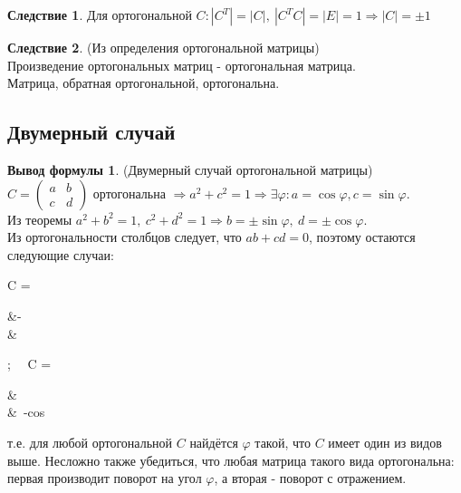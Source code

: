 \documentclass[a4paper, 12pt]{article}
\renewcommand{\phi}{\varphi}
\theoremstyle{definition}
\newtheorem*{consequense}{Следствие}
\newtheorem*{formula}{Вывод формулы}
\newenvironment{boxedalign*}
  {\begin{equation*}\begin{lrbox}{\boxedalignbox}$\begin{aligned}}
  {\end{aligned}$\end{lrbox}\fbox{\usebox{\boxedalignbox}}\end{equation*}}
\begin{document}
	\begin{consequense}
		Для ортогональной $C: |C^T| = |C|, \ |C^T C| = |E| = 1 \Rightarrow |C| = \pm 1$
	\end{consequense}
	\begin{consequense}(Из определения ортогональной матрицы)\\
		Произведение ортогональных матриц - ортогональная матрица.\\
		Матрица, обратная ортогональной, ортогональна.
	\end{consequense}
	\subsection{Двумерный случай}
	\begin{formula}(Двумерный случай ортогональной матрицы)\\
		$C = \begin{pmatrix} a&b\\c&d \end{pmatrix}$ ортогональна $\Rightarrow a^2 + c^2 = 1 \Rightarrow \exists \phi: a = \cos\phi, c = \sin\phi$.\\
		Из теоремы $a^2 + b^2 = 1, \ c^2 + d^2 = 1 \Rightarrow b = \pm\sin\phi, \ d = \pm\cos\phi$.\\
		Из ортогональности столбцов следует, что $ab + cd = 0$, поэтому остаются следующие случаи: \begin{boxedalign*}C = \begin{pmatrix} \cos\phi&-\sin\phi\\\sin\phi&\cos\phi\end{pmatrix}; \ \ C = \begin{pmatrix} \cos\phi&\sin\phi\\\sin\phi&\ -cos\phi\end{pmatrix}\end{boxedalign*}
		т.е. для любой ортогональной $C$ найдётся $\phi$ такой, что $C$ имеет один из видов выше. Несложно также убедиться, что любая матрица такого вида ортогональна: первая производит поворот на угол $\phi$, а вторая - поворот с отражением.
	\end{formula}
\end{document}
